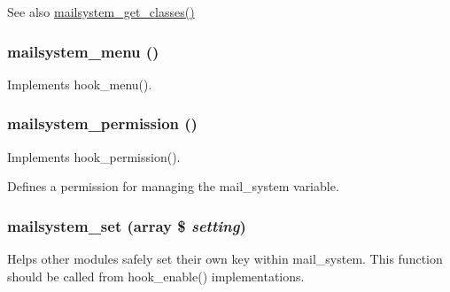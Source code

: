 \begin{DoxySeeAlso}{See also}
\hyperlink{mailsystem_8module_aa0df7ed89cbad0a84bc5da2b5d8f551a}{mailsystem\_\-get\_\-classes()} 
\end{DoxySeeAlso}
\hypertarget{mailsystem_8module_a5540af016c9247e7f9505ebcb1a8883b}{
\subsubsection[{mailsystem\_\-menu}]{\setlength{\rightskip}{0pt plus 5cm}mailsystem\_\-menu ()}}
\label{mailsystem_8module_a5540af016c9247e7f9505ebcb1a8883b}
Implements hook\_\-menu(). \hypertarget{mailsystem_8module_a661f773ba0f39c8574a74280c979660f}{
\subsubsection[{mailsystem\_\-permission}]{\setlength{\rightskip}{0pt plus 5cm}mailsystem\_\-permission ()}}
\label{mailsystem_8module_a661f773ba0f39c8574a74280c979660f}
Implements hook\_\-permission().

Defines a permission for managing the mail\_\-system variable. \hypertarget{mailsystem_8module_a2b62d67e268ecc0f8302ac7043d71927}{
\subsubsection[{mailsystem\_\-set}]{\setlength{\rightskip}{0pt plus 5cm}mailsystem\_\-set (array \$ {\em setting})}}
\label{mailsystem_8module_a2b62d67e268ecc0f8302ac7043d71927}
Helps other modules safely set their own key within mail\_\-system. This function should be called from hook\_\-enable() implementations.



